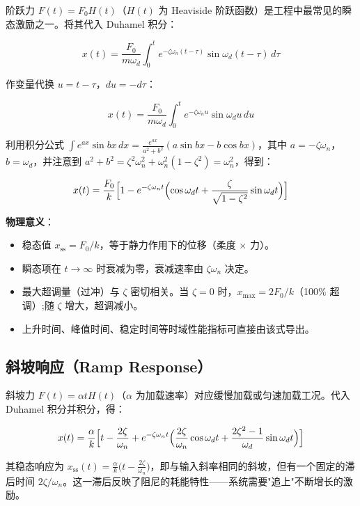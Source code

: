 阶跃力 $F(t) = F_0 H(t)$（$H(t)$ 为 Heaviside 阶跃函数）是工程中最常见的瞬态激励之一。将其代入 Duhamel 积分：

\[
x(t) = \frac{F_0}{m\omega_d} \int_{0}^{t} e^{-\zeta\omega_n (t-\tau)} \sin\omega_d (t-\tau)\,d\tau
\]

作变量代换 $u = t-\tau$，$du = -d\tau$：

\[
x(t) = \frac{F_0}{m\omega_d} \int_{0}^{t} e^{-\zeta\omega_n u} \sin\omega_d u\,du
\]

利用积分公式 $\int e^{ax}\sin bx\,dx = \frac{e^{ax}}{a^2+b^2}(a\sin bx - b\cos bx)$，其中 $a = -\zeta\omega_n$，$b = \omega_d$，并注意到 $a^2+b^2 = \zeta^2\omega_n^2 + \omega_n^2(1-\zeta^2) = \omega_n^2$，得到：

\begin{myformula}
\[
x(t) = \frac{F_0}{k} \Bigl[ 1 - e^{-\zeta\omega_n t}\Bigl( \cos\omega_d t + \frac{\zeta}{\sqrt{1-\zeta^2}} \sin\omega_d t \Bigr) \Bigr]
\]
\end{myformula}

\textbf{物理意义}：
\begin{itemize}
\item 稳态值 $x_{\text{ss}} = F_0/k$，等于静力作用下的位移（柔度 $\times$ 力）。
\item 瞬态项在 $t \to \infty$ 时衰减为零，衰减速率由 $\zeta\omega_n$ 决定。
\item 最大超调量（过冲）与 $\zeta$ 密切相关。当 $\zeta=0$ 时，$x_{\max} = 2F_0/k$（100\% 超调）;随 $\zeta$ 增大，超调减小。
\item 上升时间、峰值时间、稳定时间等时域性能指标可直接由该式导出。
\end{itemize}

\subsection{斜坡响应（Ramp Response）}

斜坡力 $F(t) = \alpha t H(t)$（$\alpha$ 为加载速率）对应缓慢加载或匀速加载工况。代入 Duhamel 积分并积分，得：

\begin{myformula}
\[
x(t) = \frac{\alpha}{k} \Bigl[ t - \frac{2\zeta}{\omega_n} + e^{-\zeta\omega_n t}\Bigl( \frac{2\zeta}{\omega_n}\cos\omega_d t + \frac{2\zeta^2-1}{\omega_d}\sin\omega_d t \Bigr) \Bigr]
\]
\end{myformula}

其稳态响应为 $x_{\text{ss}}(t) = \frac{\alpha}{k}\bigl(t - \frac{2\zeta}{\omega_n}\bigr)$，即与输入斜率相同的斜坡，但有一个固定的滞后时间 $2\zeta/\omega_n$。这一滞后反映了阻尼的耗能特性——系统需要"追上"不断增长的激励。

